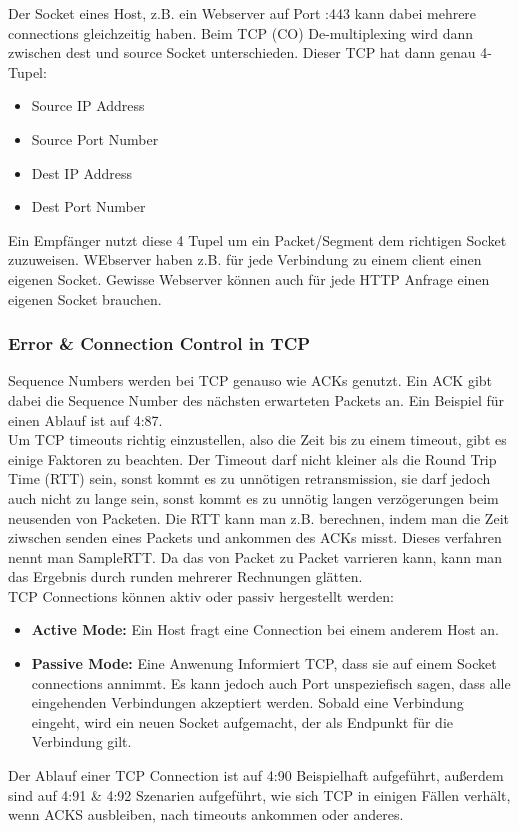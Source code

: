 			Der Socket eines Host, z.B. ein Webserver auf Port :443 kann dabei mehrere connections gleichzeitig haben. Beim TCP (CO) De-multiplexing wird dann zwischen dest und source Socket unterschieden. Dieser TCP hat dann genau 4-Tupel:
			\begin{itemize}
				\item Source IP Address
				\item Source Port Number
				\item Dest IP Address
				\item Dest Port Number
			\end{itemize}
			Ein Empfänger nutzt diese 4 Tupel um ein Packet/Segment dem richtigen Socket zuzuweisen. WEbserver haben z.B. für jede Verbindung zu einem client einen eigenen Socket. Gewisse Webserver können auch für jede HTTP Anfrage einen eigenen Socket brauchen. 

		\subsubsection{Error \& Connection Control in TCP}
			Sequence Numbers werden bei TCP genauso wie ACKs genutzt. Ein ACK gibt dabei die Sequence Number des nächsten erwarteten Packets an. Ein Beispiel für einen Ablauf ist auf 4:87. \\
			Um TCP timeouts richtig einzustellen, also die Zeit bis zu einem timeout, gibt es einige Faktoren zu beachten. Der Timeout darf nicht kleiner als die Round Trip Time (RTT) sein, sonst kommt es zu unnötigen retransmission, sie darf jedoch auch nicht zu lange sein, sonst kommt es zu unnötig langen verzögerungen beim neusenden von Packeten. Die RTT kann man z.B. berechnen, indem man die Zeit ziwschen senden eines Packets und ankommen des ACKs misst. Dieses verfahren nennt man SampleRTT. Da das von Packet zu Packet varrieren kann, kann man das Ergebnis durch runden mehrerer Rechnungen glätten. \\
			TCP Connections können aktiv oder passiv hergestellt werden:
			\begin{itemize}
				\item \textbf{Active Mode:} Ein Host fragt eine Connection bei einem anderem Host an. 
				\item \textbf{Passive Mode:} Eine Anwenung Informiert TCP, dass sie auf einem Socket connections annimmt. Es kann jedoch auch Port unspeziefisch sagen, dass alle eingehenden Verbindungen akzeptiert werden. Sobald eine Verbindung eingeht, wird ein neuen Socket aufgemacht, der als Endpunkt für die Verbindung gilt. 
			\end{itemize}
			Der Ablauf einer TCP Connection ist auf 4:90 Beispielhaft aufgeführt, außerdem sind auf 4:91 \& 4:92 Szenarien aufgeführt, wie sich TCP in einigen Fällen verhält, wenn ACKS ausbleiben, nach timeouts ankommen oder anderes. 

